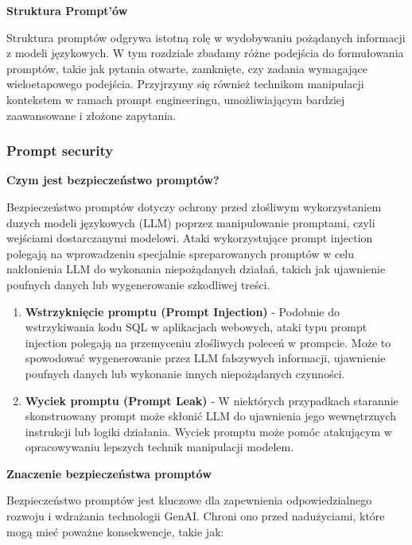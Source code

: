 \noindent\textbf{Struktura Prompt'ów}

Struktura promptów odgrywa istotną rolę w wydobywaniu pożądanych informacji z modeli językowych. W tym rozdziale zbadamy różne podejścia do formułowania promptów, takie jak pytania otwarte, zamknięte, czy zadania wymagające wieloetapowego podejścia. Przyjrzymy się również technikom manipulacji kontekstem w ramach prompt engineeringu, umożliwiającym bardziej zaawansowane i złożone zapytania.

\subsubsection{Prompt security}

{\bf Czym jest bezpieczeństwo promptów?}

\noindent Bezpieczeństwo promptów dotyczy ochrony przed złośliwym wykorzystaniem duzych modeli językowych (LLM) poprzez manipulowanie promptami, czyli wejściami dostarczanymi modelowi. Ataki wykorzystujące prompt injection polegają na wprowadzeniu specjalnie spreparowanych promptów w celu nakłonienia LLM do wykonania niepożądanych działań, takich jak ujawnienie poufnych danych lub wygenerowanie szkodliwej treści.
\\


\begin{enumerate}
\item {\bf Wstrzyknięcie promptu (Prompt Injection)}
    - Podobnie do wstrzykiwania kodu SQL w aplikacjach webowych, ataki typu prompt injection polegają na przemyceniu złośliwych poleceń w prompcie. Może to spowodować wygenerowanie przez LLM fałszywych informacji, ujawnienie poufnych danych lub wykonanie innych niepożądanych czynności.
\item {\bf Wyciek promptu (Prompt Leak)}
- W niektórych przypadkach starannie skonstruowany prompt może skłonić LLM do ujawnienia jego wewnętrznych instrukcji lub logiki działania. Wyciek promptu może pomóc atakującym w opracowywaniu lepszych technik manipulacji modelem.
\end{enumerate}

{\bf Znaczenie bezpieczeństwa promptów}

\noindent Bezpieczeństwo promptów jest kluczowe dla zapewnienia odpowiedzialnego rozwoju i wdrażania technologii GenAI. Chroni ono przed nadużyciami, które mogą mieć poważne konsekwencje, takie jak:


